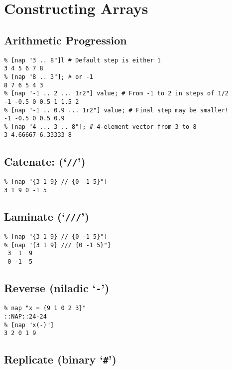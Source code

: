 
\section{Constructing Arrays}

\subsection{Arithmetic Progression}

    \begin{verbatim}
% [nap "3 .. 8"]l # Default step is either 1
3 4 5 6 7 8
% [nap "8 .. 3"]; # or -1
8 7 6 5 4 3
% [nap "-1 .. 2 ... 1r2"] value; # From -1 to 2 in steps of 1/2
-1 -0.5 0 0.5 1 1.5 2
% [nap "-1 .. 0.9 ... 1r2"] value; # Final step may be smaller!
-1 -0.5 0 0.5 0.9
% [nap "4 ... 3 .. 8"]; # 4-element vector from 3 to 8 
3 4.66667 6.33333 8
\end{verbatim}

\subsection{Catenate: (`\texttt{//}')}

    \begin{verbatim}
% [nap "{3 1 9} // {0 -1 5}"]
3 1 9 0 -1 5
\end{verbatim}

\subsection{Laminate (`\texttt{///}')}

    \begin{verbatim}
% [nap "{3 1 9} // {0 -1 5}"]
% [nap "{3 1 9} /// {0 -1 5}"]
 3  1  9
 0 -1  5
\end{verbatim}

\subsection{Reverse (niladic `\texttt{-}')}

    \begin{verbatim}
% nap "x = {9 1 0 2 3}"
::NAP::24-24
% [nap "x(-)"]
3 2 0 1 9
\end{verbatim}

\subsection{Replicate (binary `\texttt{\#}')}

